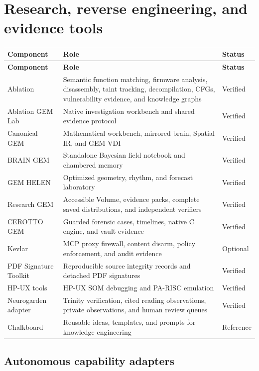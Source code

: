\documentclass[11pt]{article}
\begin{document}
\clearpage
\section{Research, reverse engineering, and evidence tools}

\begin{longtable}{p{}p{}p{}}
\toprule
\textbf{Component} & \textbf{Role} & \textbf{Status}\\
\midrule
\endfirsthead
\toprule
\textbf{Component} & \textbf{Role} & \textbf{Status}\\
\midrule
\endhead
Ablation & Semantic function matching, firmware analysis, disassembly, taint tracking, decompilation, CFGs, vulnerability evidence, and knowledge graphs & Verified\\
Ablation GEM Lab & Native investigation workbench and shared evidence protocol & Verified\\
Canonical GEM & Mathematical workbench, mirrored brain, Spatial IR, and GEM VDI & Verified\\
BRAIN GEM & Standalone Bayesian field notebook and chambered memory & Verified\\
GEM HELEN & Optimized geometry, rhythm, and forecast laboratory & Verified\\
Research GEM & Accessible Volume, evidence packs, complete saved distributions, and independent verifiers & Verified\\
CEROTTO GEM & Guarded forensic cases, timelines, native C engine, and vault evidence & Verified\\
Kevlar & MCP proxy firewall, content disarm, policy enforcement, and audit evidence & Optional\\
PDF Signature Toolkit & Reproducible source integrity records and detached PDF signatures & Verified\\
HP-UX tools & HP-UX SOM debugging and PA-RISC emulation & Verified\\
Neurogarden adapter & Trinity verification, cited reading observations, private observations, and human review queues & Verified\\
Chalkboard & Reusable ideas, templates, and prompts for knowledge engineering & Reference\\
\bottomrule
\end{longtable}

\subsection{Autonomous capability adapters}
\end{document}
